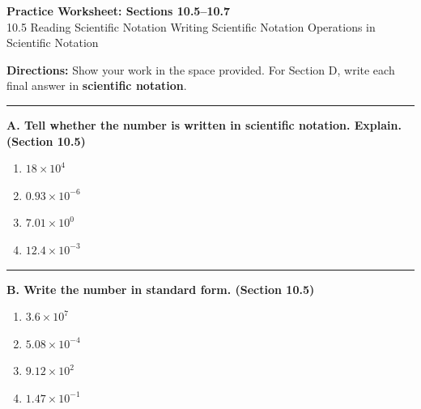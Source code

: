 \documentclass[11pt]{article}
\newcommand{\work}[1]{\vspace{#1}\par}
\begin{document}
\begin{center}
{\Large \textbf{Practice Worksheet: Sections 10.5--10.7}}\\[4pt]
{\small 10.5 Reading Scientific Notation  Writing Scientific Notation  Operations in Scientific Notation}
\end{center}

\textbf{Directions:} Show your work in the space provided. For Section D, write each final answer in \textbf{scientific notation}.

\vspace{0.4em}\hrule\vspace{0.9em}

\textbf{A. Tell whether the number is written in scientific notation. Explain. (Section 10.5)}

\begin{enumerate}[label=\arabic*.]
\item $18 \times 10^{4}$
\work{1.0in}

\item $0.93 \times 10^{-6}$
\work{1.0in}

\item $7.01 \times 10^{0}$
\work{1.0in}

\item $12.4 \times 10^{-3}$
\work{1.0in}
\end{enumerate}

\vspace{0.2em}\hrule\vspace{0.9em}

\textbf{B. Write the number in standard form. (Section 10.5)}

\begin{enumerate}[label=\arabic*., resume]
\item $3.6 \times 10^{7}$
\work{1.1in}

\item $5.08 \times 10^{-4}$
\work{1.1in}

\item $9.12 \times 10^{2}$
\work{1.1in}

\item $1.47 \times 10^{-1}$
\work{1.1in}
\end{enumerate}
\end{document}
